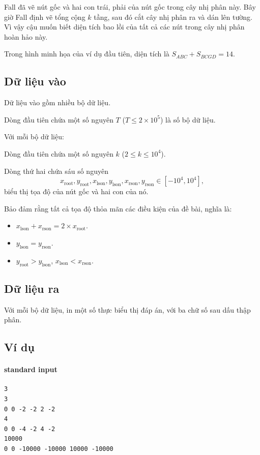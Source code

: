 \documentclass[11pt]{article}
\begin{document}
Fall đã vẽ nút gốc và hai con trái, phải của nút gốc trong cây nhị phân này.
Bây giờ Fall định vẽ tổng cộng \(k\) tầng, sau đó cắt cây nhị phân ra và dán
lên tường. Vì vậy cậu muốn biết diện tích bao lồi của tất cả các nút trong
cây nhị phân hoàn hảo này.

Trong hình minh họa của ví dụ đầu tiên, diện tích là \(S_{ABC}+S_{BCGD}=14\).

\subsection*{Dữ liệu vào}

Dữ liệu vào gồm nhiều bộ dữ liệu.

Dòng đầu tiên chứa một số nguyên \(T\) (\(T\le 2\times 10^5\)) là số bộ dữ
liệu.

Với mỗi bộ dữ liệu:

Dòng đầu tiên chứa một số nguyên \(k\) (\(2\le k\le 10^4\)).

Dòng thứ hai chứa sáu số nguyên
\[
  x_{\text{root}},y_{\text{root}},x_{\text{lson}},y_{\text{lson}},
  x_{\text{rson}},y_{\text{rson}}\in[-10^4,10^4],
\]
biểu thị tọa độ của nút gốc và hai con của nó.

Bảo đảm rằng tất cả tọa độ thỏa mãn các điều kiện của đề bài, nghĩa là:

\begin{itemize}
  \item \(x_{\text{lson}}+x_{\text{rson}}=2\times x_{\text{root}}\).
  \item \(y_{\text{lson}}=y_{\text{rson}}\).
  \item \(y_{\text{root}}>y_{\text{lson}}\), \(x_{\text{lson}}<x_{\text{rson}}\).
\end{itemize}

\subsection*{Dữ liệu ra}

Với mỗi bộ dữ liệu, in một số thực biểu thị đáp án, với ba chữ số sau dấu
thập phân.

\subsection*{Ví dụ}

\paragraph{standard input}
\begin{verbatim}
3
3
0 0 -2 -2 2 -2
4
0 0 -4 -2 4 -2
10000
0 0 -10000 -10000 10000 -10000
\end{verbatim}
\end{document}
